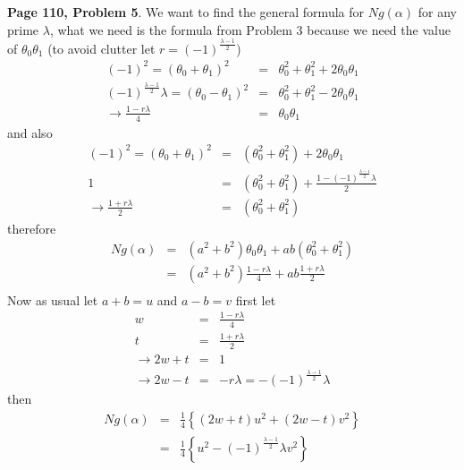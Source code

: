\documentclass[aps,preprint,preprintnumbers,nofootinbib,showpacs,prd]{revtex4-1}
\newcommand{\nbea}{\begin{eqnarray*}}
\newcommand{\neea}{\end{eqnarray*}}
\begin{document}
{\bf Page 110, Problem 5}. We want to find the general formula for $Ng(\alpha)$ for any prime $\lambda$, what we need is the formula from Problem 3 because we need the value of $\theta_0\theta_1$ (to avoid clutter let $r = (-1)^{\frac{\lambda - 1}{2}}$)
%
\nbea
(-1)^2 = (\theta_0 + \theta_1)^2 & = & \theta_0^2 + \theta_1^2 + 2\theta_0\theta_1 \\
(-1)^{\frac{\lambda - 1}{2}}\lambda = (\theta_0 - \theta_1)^2 & = & \theta_0^2 + \theta_1^2 - 2\theta_0\theta_1 \\
\to \frac{1 - r\lambda}{4} & = & \theta_0\theta_1
\neea
%
and also
%
\nbea
(-1)^2 = (\theta_0 + \theta_1)^2 & = & (\theta^2_0 + \theta^2_1) + 2\theta_0\theta_1 \\
1 & = & (\theta^2_0 + \theta^2_1) + \frac{1 - (-1)^{\frac{\lambda - 1}{2}}\lambda}{2} \\
\to \frac{1 + r\lambda}{2} & = & (\theta^2_0 + \theta^2_1)
\neea
%
therefore
%
\nbea
Ng(\alpha) & = & (a^2 + b^2)\theta_0\theta_1  + ab(\theta^2_0 + \theta^2_1) \\
& = & (a^2 + b^2)\frac{1 - r\lambda}{4}  + ab\frac{1 + r\lambda}{2} \\
\neea
%
Now as usual let $a + b = u$ and $a - b = v$ first let
%
\nbea
w & = & \frac{1 - r\lambda}{4} \\
t & = & \frac{1 + r\lambda}{2} \\
\to 2w + t & = & 1 \\
\to 2w - t & = & -r\lambda = -(-1)^{\frac{\lambda - 1}{2}}\lambda
\neea
%
then
%
\nbea
Ng(\alpha) & = & \tfrac{1}{4}\left\{(2w + t)u^2 + (2w - t)v^2 \right\} \\
& = & \tfrac{1}{4}\left\{u^2 -(-1)^{\frac{\lambda - 1}{2}}\lambda v^2 \right\}
\neea
%
\end{document}
